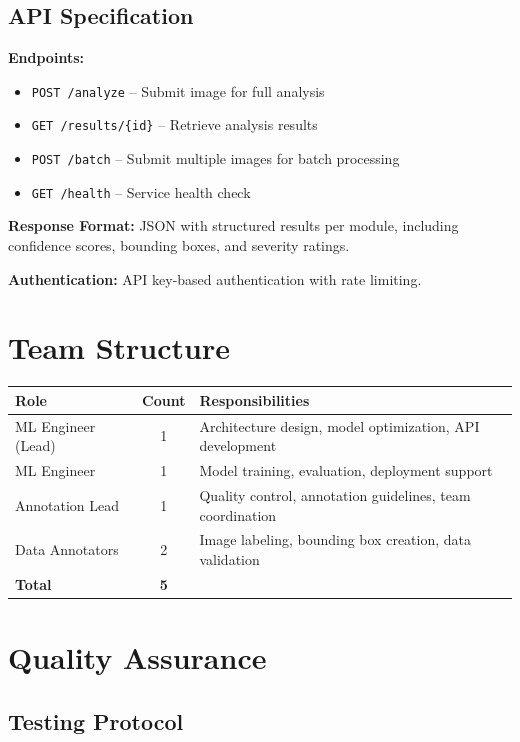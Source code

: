 \documentclass[11pt,a4paper]{article}
\begin{document}
\subsection{API Specification}

\textbf{Endpoints:}
\begin{itemize}[leftmargin=*]
\item \texttt{POST /analyze} -- Submit image for full analysis
\item \texttt{GET /results/\{id\}} -- Retrieve analysis results
\item \texttt{POST /batch} -- Submit multiple images for batch processing
\item \texttt{GET /health} -- Service health check
\end{itemize}

\textbf{Response Format:} JSON with structured results per module, including confidence scores, bounding boxes, and severity ratings.

\textbf{Authentication:} API key-based authentication with rate limiting.

\section{Team Structure}

\begin{center}
\begin{tabular}{lcp{6cm}}
\toprule
\textbf{Role} & \textbf{Count} & \textbf{Responsibilities} \\
\midrule
ML Engineer (Lead) & 1 & Architecture design, model optimization, API development \\
ML Engineer & 1 & Model training, evaluation, deployment support \\
Annotation Lead & 1 & Quality control, annotation guidelines, team coordination \\
Data Annotators & 2 & Image labeling, bounding box creation, data validation \\
\midrule
\textbf{Total} & \textbf{5} & \\
\bottomrule
\end{tabular}
\end{center}

\section{Quality Assurance}


\subsection{Testing Protocol}
\end{document}
